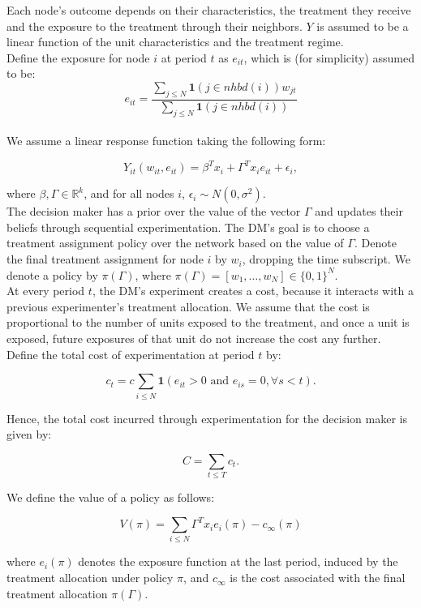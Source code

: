 \documentclass[12pt,a4paper]{article}
\begin{document}
Each node's outcome depends on their characteristics, the treatment they receive and the exposure to the treatment through their neighbors. $Y$ is assumed to be a linear function of the unit characteristics and the treatment regime. \\

Define the exposure for node $i$ at period $t$ as $e_{it}$, which is (for simplicity) assumed to be: 
$$e_{it} = \frac { \sum_{j \leq N}  \mathbf{1}(j \in nhbd(i)) w_{jt}}{ \sum_{j \leq N} \mathbf{1}(j \in nhbd(i)) }$$\\

We assume a linear response function taking the following form:

$$Y_{it}( w_{it}, e_{it}) = \beta^T x_i + \Gamma^T x_i e_{it} + \epsilon_i,$$

where $\beta, \Gamma \in \mathbb{R}^k$, and for all nodes $i$, $\epsilon_i \sim N(0, \sigma^2)$.\\

The decision maker has a prior over the value of the vector $\Gamma$ and updates their beliefs through sequential experimentation. The DM's goal is to choose a treatment assignment policy over the network based on the value of $\Gamma$. Denote the final treatment assignment for node $i$ by $w_i$, dropping the time subscript. We denote a policy by $\pi(\Gamma)$, where $\pi(\Gamma)=[w_1, \dots , w_N] \in \{0,1\}^N$.\\

At every period $t$, the DM's experiment creates a cost, because it interacts with a previous experimenter's treatment allocation. We assume that the cost is proportional to the number of units exposed to the treatment, and once a unit is exposed, future exposures of that unit do not increase the cost any further. Define the total cost of experimentation at period $t$ by:

$$c_t = c \sum_{i \leq N} \mathbf{1}\left( e_{it} > 0 \mbox{ and } e_{is}=0,  \forall s<t \right) .$$

Hence, the total cost incurred through experimentation for the decision maker is given by:

$$ C= \sum_{t \leq T} c_t  .$$

We define the value of a policy as follows:

$$V(\pi)=\sum_{i \leq N} \Gamma^T x_i e_i(\pi) - c_\infty(\pi)$$

where $e_i(\pi)$ denotes the exposure function at the last period, induced by the treatment allocation under policy $\pi$, and $c_\infty$ is the cost associated with the final treatment allocation $\pi(\Gamma)$. \\
\end{document}
